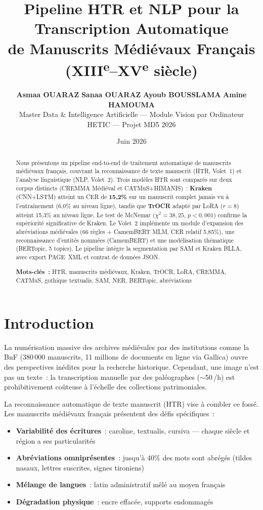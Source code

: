 \documentclass[11pt,a4paper]{article}
\title{\textbf{Pipeline HTR et NLP pour la Transcription Automatique\\de Manuscrits Médiévaux Français (XIII\textsuperscript{e}--XV\textsuperscript{e} siècle)}}
\author{
\textbf{Asmaa OUARAZ} \quad \textbf{Sanaa OUARAZ} \quad \textbf{Ayoub BOUSSLAMA} \quad \textbf{Amine HAMOUMA}\\[0.3cm]
Master Data \& Intelligence Artificielle --- Module Vision par Ordinateur\\
HETIC --- Projet MD5 2026
}
\date{Juin 2026}
\begin{document}
\maketitle

\begin{abstract}
\noindent
Nous présentons un pipeline end-to-end de traitement automatique de manuscrits médiévaux français, couvrant la reconnaissance de texte manuscrit (HTR, Volet~1) et l'analyse linguistique (NLP, Volet~2). Trois modèles HTR sont comparés sur deux corpus distincts (CREMMA Médiéval et CATMuS+HIMANIS)~: \textbf{Kraken} (CNN+LSTM) atteint un CER de \textbf{15,2\%} sur un manuscrit complet jamais vu à l'entraînement (6,0\% au niveau ligne), tandis que \textbf{TrOCR} adapté par LoRA ($r=8$) atteint 15,3\% au niveau ligne. Le test de McNemar ($\chi^2=38,25$, $p<0,001$) confirme la supériorité significative de Kraken. Le Volet~2 implémente un module d'expansion des abréviations médiévales (66 règles + CamemBERT MLM, CER relatif 5,85\%), une reconnaissance d'entités nommées (CamemBERT) et une modélisation thématique (BERTopic, 5 topics). Le pipeline intègre la segmentation par SAM et Kraken BLLA, avec export PAGE~XML et contrat de données JSON.

\vspace{0.2cm}
\noindent\textbf{Mots-clés~:} HTR, manuscrits médiévaux, Kraken, TrOCR, LoRA, CREMMA, CATMuS, gothique textualis, SAM, NER, BERTopic, abréviations
\end{abstract}

\vspace{0.5cm}

\section{Introduction}

La numérisation massive des archives médiévales par des institutions comme la BnF (380\,000 manuscrits, 11 millions de documents en ligne via Gallica) ouvre des perspectives inédites pour la recherche historique. Cependant, une image n'est pas un texte~: la transcription manuelle par des paléographes ($\sim$50\,\texteuro/h) est prohibitivement coûteuse à l'échelle des collections patrimoniales.

La reconnaissance automatique de texte manuscrit (HTR) vise à combler ce fossé. Les manuscrits médiévaux français présentent des défis spécifiques~:
\begin{itemize}[leftmargin=*, itemsep=2pt]
\item \textbf{Variabilité des écritures}~: caroline, textualis, cursiva --- chaque siècle et région a ses particularités
\item \textbf{Abréviations omniprésentes}~: jusqu'à 40\% des mots sont abrégés (tildes nasaux, lettres suscrites, signes tironiens)
\item \textbf{Mélange de langues}~: latin administratif mêlé au moyen français
\item \textbf{Dégradation physique}~: encre effacée, supports endommagés
\end{itemize}
\end{document}
